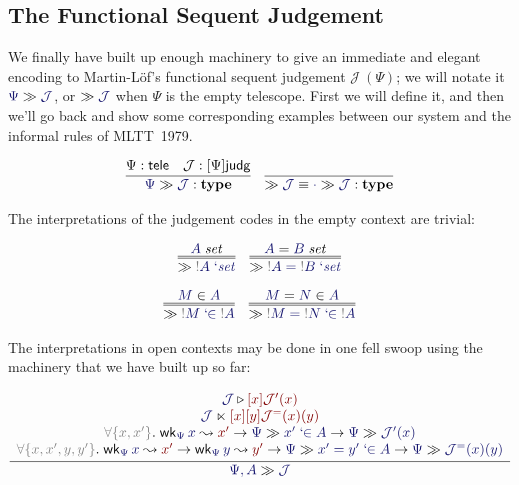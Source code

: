 \documentclass[acmtoplas]{acmtrans2m}
\def\InputModeColorName{MidnightBlue}
\def\OutputModeColorName{Maroon}
\newcommand\InputMode[1]{{\color{\InputModeColorName}{#1}}}
\newcommand\OutputMode[1]{{\color{\OutputModeColorName}{#1}}}
\newcommand\type{\mathbf{type}}
\newcommand\sorttele{\mathsf{tele}}
\newcommand\sortj{\mathsf{judg}}
\newcommand\sortoj[1]{[#1]\sortj}
\newcommand\nobind[1]{{\color{Gray}!}#1}
\newcommand\isset[1]{\InputMode{#1}\;\mathit{set}}
\newcommand\eqset[2]{\InputMode{#1}=\InputMode{#2}\;\mathit{set}}
\newcommand\mem[2]{\InputMode{#1}\in\InputMode{#2}}
\newcommand\eqmem[3]{\InputMode{#1}=\InputMode{#2}\in\InputMode{#3}}
\newcommand\lfpi[2]{{\color{Gray}\forall\{#1\}}.\;#2}
\newcommand\weaken[3]{\mathsf{wk}_{\InputMode{#1}}\,\InputMode{#2}\leadsto\OutputMode{#3}}
\newcommand\qisset[1]{#1\;`\mathit{set}}
\newcommand\qeqset[2]{#1=#2\;`\mathit{set}}
\newcommand\qmem[2]{#1\;`\!\!\in#2}
\newcommand\qeqmem[3]{#1=#2\;`\!\!\in#3}
\newcommand\sploot[2]{\InputMode{#1}\triangleright\OutputMode{#2}}
\newcommand\refract[2]{\InputMode{#1}\ltimes\OutputMode{#2}}
\newcommand\sequent[2]{\InputMode{#1}\gg\InputMode{#2}}
\newcommand\nece[1]{\gg\InputMode{#1}}
\begin{document}
\subsection{The Functional Sequent Judgement}

We finally have built up enough machinery to give an immediate and elegant
encoding to Martin-L\"of's functional sequent judgement $\mathcal{J}\ (\Psi)$;
we will notate it $\sequent{\Psi}{\mathcal{J}}$, or $\nece{\mathcal{J}}$ when
$\Psi$ is the empty telescope. First we will define it, and then we'll go back
and show some corresponding examples between our system and the informal rules
of MLTT~1979.

\begin{gather*}
  \infer{
    \sequent{\Psi}{\mathcal{J}}:\type
  }{
    \Psi:\sorttele &
    \mathcal{J}:\sortoj\Psi
  }
  \quad
  \infer{
    \nece{\mathcal{J}} \equiv \sequent{\cdot}{\mathcal{J}} : \type
  }{
  }
\end{gather*}

The interpretations of the judgement codes in the empty context are trivial:

\begin{gather*}
  \infer={
    \nece{\qisset{\nobind{A}}}
  }{
    \isset{A}
  }
  \quad
  \infer={
    \nece{\qeqset{\nobind{A}}{\nobind{B}}}
  }{
    \eqset{A}{B}
  }\\[6pt]
  \infer={
    \nece{\qmem{\nobind{M}}{\nobind{A}}}
  }{
    \mem{M}{A}
  }
  \quad
  \infer={
    \nece{\qeqmem{\nobind{M}}{\nobind{N}}{\nobind{A}}}
  }{
    \eqmem{M}{N}{A}
  }
\end{gather*}

The interpretations in open contexts may be done in one fell swoop using the
machinery that we have built up so far:

\begin{gather*}
  \infer{
    \sequent{\Psi,A}{\mathcal{J}}
  }{
    \begin{array}{c}
      \sploot{\mathcal{J}}{[x]\mathcal{J}'(x)}\\
      \refract{\mathcal{J}}{[x][y]\mathcal{J}^=(x)(y)}\\
      \lfpi{x,x'}{
        \weaken{\Psi}{x}{x'}
        \to\sequent{\Psi}{\qmem{x'}{A}}
        \to\sequent{\Psi}{\mathcal{J}'(x)}
      }\\
      \lfpi{x,x',y,y'}{
        \weaken{\Psi}{x}{x'}
        \to\weaken{\Psi}{y}{y'}
        \to\sequent{\Psi}{\qeqmem{x'}{y'}{A}}
        \to\sequent{\Psi}{\mathcal{J}^=(x)(y)}
      }\\
    \end{array}
  }
\end{gather*}
\end{document}
